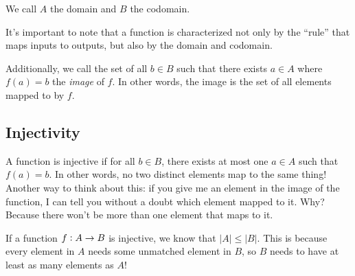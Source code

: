 \documentclass[12pt,letterpaper]{article}
\begin{document}
    We call $A$ the domain and $B$ the codomain.
    
    It's important to note that a function is characterized not only by the ``rule'' that maps inputs to outputs, but also by the domain and codomain.
    
    Additionally, we call the set of all $b \in B$ such that there exists $a \in A$ where $f(a) = b$ the \textit{image} of $f$. In other words, the image is the set of all elements mapped to by $f$.
    
    \subsection{Injectivity}

    A function is injective if for all $b \in B$, there exists at most one $a \in A$ such that $f(a) = b$. In other words, no two distinct elements map to the same thing! Another way to think about this: if you give me an element in the image of the function, I can tell you without a doubt which element mapped to it. Why? Because there won't be more than one element that maps to it.
    
    If a function $f \vcentcolon A \rightarrow B$ is injective, we know that $|A| \leq |B|$. This is because every element in $A$ needs some unmatched element in $B$, so $B$ needs to have at least as many elements as $A$!
    
    
    \begin{figure}[h]
     \centering
    \end{figure}
    
\end{document}
